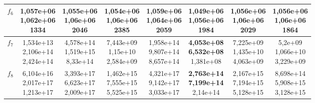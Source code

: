\begin{table}[t]
\begin{small}
\begin{tabular}{|c|c|c|c|c|c|c|c|}
        $f_6$    & \makecell{1,057e+06 \\ 1,062e+06 \\ 1334}      & \makecell{1,055e+06 \\ 1,06e+06 \\ 2046}       & \makecell{1,054e+06 \\ 1,06e+06 \\ 2385}       & \makecell{1,059e+06 \\ 1,064e+06 \\ 2059}      & \makecell{\textbf{1,049e+06} \\ \textbf{1,056e+06} \\ 1984}      & \makecell{1,056e+06 \\ 1,06e+06 \\ 2029}       & \makecell{1,056e+06 \\ 1,06e+06 \\ 1864}       \\\hline
        $f_7$    & \makecell{1,534e+13 \\ 2,106e+14 \\ 2,424e+14} & \makecell{4,578e+14 \\ 1,519e+15 \\ 8,33e+14}  & \makecell{7,443e+09 \\ 1,15e+10 \\ 2,584e+09}  & \makecell{1,958e+14 \\ 9,807e+14 \\ 8,657e+14} & \makecell{\textbf{4,053e+08} \\ \textbf{6,532e+08} \\ 1,381e+08} & \makecell{7,225e+09 \\ 1,435e+10 \\ 4,063e+09} & \makecell{5,2e+09 \\ 1,066e+10 \\ 3,229e+09}   \\\hline
        $f_8$    & \makecell{6,104e+16 \\ 2,017e+17 \\ 1,213e+17} & \makecell{3,393e+17 \\ 6,623e+17 \\ 2,009e+17} & \makecell{1,462e+15 \\ 7,555e+15 \\ 5,525e+15} & \makecell{4,321e+17 \\ 9,142e+17 \\ 3,033e+17} & \makecell{\textbf{2,763e+14} \\ \textbf{7,199e+14} \\ 2,14e+14}  & \makecell{2,167e+15 \\ 7,194e+15 \\ 5,128e+15} & \makecell{8,698e+14 \\ 5,908e+15 \\ 3,128e+15} \\\hline

\end{tabular}
\end{small}
\end{table}
